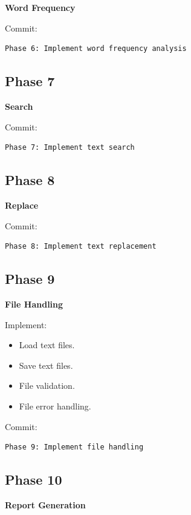 \documentclass[12pt,a4paper]{article}
\begin{document}
\textbf{Word Frequency}

Commit:

\begin{verbatim}
Phase 6: Implement word frequency analysis
\end{verbatim}

\subsection{Phase 7}

\textbf{Search}

Commit:

\begin{verbatim}
Phase 7: Implement text search
\end{verbatim}

\subsection{Phase 8}

\textbf{Replace}

Commit:

\begin{verbatim}
Phase 8: Implement text replacement
\end{verbatim}

\subsection{Phase 9}

\textbf{File Handling}

Implement:

\begin{itemize}
    \item Load text files.
    \item Save text files.
    \item File validation.
    \item File error handling.
\end{itemize}

Commit:

\begin{verbatim}
Phase 9: Implement file handling
\end{verbatim}

\subsection{Phase 10}

\textbf{Report Generation}
\end{document}
